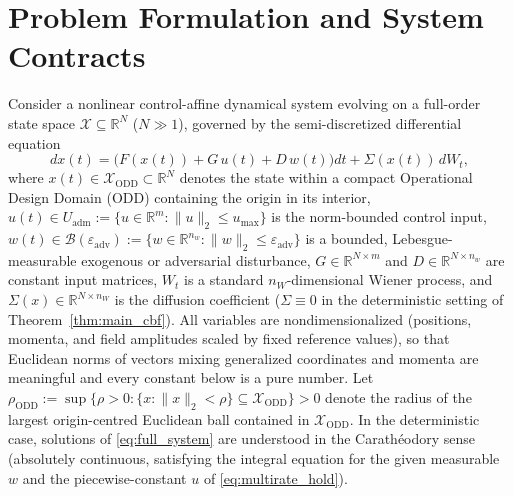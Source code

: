 \providecommand{\Pfe}{P_{\mathrm{full},\epsilon}}
\providecommand{\Pf}{P_{\mathrm{full}}}
\providecommand{\Af}{A_{\mathrm{full}}}
\providecommand{\XO}{\mathcal{X}_{\mathrm{ODD}}}
\providecommand{\ZO}{\mathcal{Z}_{\mathrm{ODD}}}
\providecommand{\DO}{D_{\mathrm{ODD}}}
\providecommand{\Tt}{\hat{\mathcal{T}}}
\providecommand{\epsP}{\varepsilon_{\mathrm{basis},P}}
\providecommand{\epsS}{\varepsilon_{\mathrm{basis},\sigma}}
\providecommand{\Lperp}{L_{\perp,P}}
\providecommand{\LTz}{L_{\mathcal{T},z}}
\providecommand{\eC}{\varepsilon_{\mathrm{CROWN}}(b_B)}
\providecommand{\eA}{\varepsilon_A(b_A)}
\providecommand{\dul}{\Delta u_{\mathrm{lag}}}
\providecommand{\hdip}{\Delta h_{\mathrm{dip}}}
\providecommand{\Crz}{\mathcal{C}_{r,0}}
\providecommand{\Cact}{\mathcal{C}_{r,\mathrm{act}}}
\providecommand{\Bint}{\mathcal{B}_{\mathrm{int}}}
\providecommand{\Lsec}{L_{\mathrm{sec}}}
\providecommand{\thK}{\theta_{\mathrm{K}}}

\section{Problem Formulation and System Contracts}
\label{sec:problem}

Consider a nonlinear control-affine dynamical system evolving on a full-order state space \(\mathcal{X} \subseteq \mathbb{R}^N\) (\(N \gg 1\)), governed by the semi-discretized differential equation
\begin{equation}
\label{eq:full_system}
dx(t) = \Big( F(x(t)) + G\,u(t) + D\,w(t) \Big) dt + \Sigma(x(t))\,dW_t,
\end{equation}
where \(x(t) \in \XO \subset \mathbb{R}^N\) denotes the state within a compact Operational Design Domain (ODD) containing the origin in its interior, \(u(t) \in U_{\mathrm{adm}} := \{u \in \mathbb{R}^m : \|u\|_2 \le u_{\max}\}\) is the norm-bounded control input, \(w(t) \in \mathcal{B}(\varepsilon_{\mathrm{adv}}) := \{w \in \mathbb{R}^{n_w} : \|w\|_2 \le \varepsilon_{\mathrm{adv}}\}\) is a bounded, Lebesgue-measurable exogenous or adversarial disturbance, \(G \in \mathbb{R}^{N\times m}\) and \(D \in \mathbb{R}^{N\times n_w}\) are constant input matrices, \(W_t\) is a standard \(n_W\)-dimensional Wiener process, and \(\Sigma(x) \in \mathbb{R}^{N\times n_W}\) is the diffusion coefficient (\(\Sigma \equiv 0\) in the deterministic setting of Theorem~\ref{thm:main_cbf}). All variables are nondimensionalized (positions, momenta, and field amplitudes scaled by fixed reference values), so that Euclidean norms of vectors mixing generalized coordinates and momenta are meaningful and every constant below is a pure number. Let \(\rho_{\mathrm{ODD}} := \sup\{\rho > 0 : \{x : \|x\|_2 < \rho\} \subseteq \XO\} > 0\) denote the radius of the largest origin-centred Euclidean ball contained in \(\XO\). In the deterministic case, solutions of \eqref{eq:full_system} are understood in the Carath\'eodory sense (absolutely continuous, satisfying the integral equation for the given measurable \(w\) and the piecewise-constant \(u\) of \eqref{eq:multirate_hold}).

